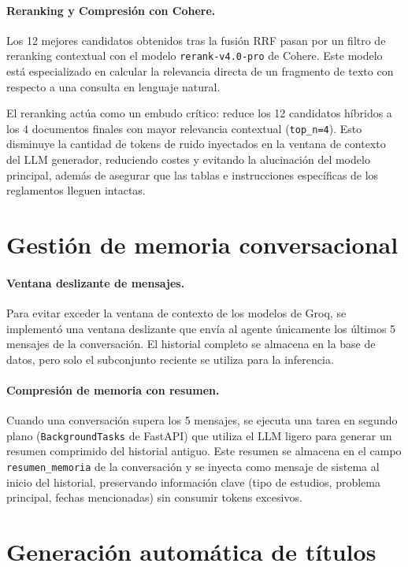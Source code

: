 \documentclass[12pt,a4paper,oneside]{report}
\begin{document}
\paragraph{Reranking y Compresión con Cohere.} Los 12 mejores candidatos obtenidos tras la fusión RRF pasan por un filtro de reranking contextual con el modelo \texttt{rerank-v4.0-pro} de Cohere. Este modelo está especializado en calcular la relevancia directa de un fragmento de texto con respecto a una consulta en lenguaje natural.

El reranking actúa como un embudo crítico: reduce los 12 candidatos híbridos a los 4 documentos finales con mayor relevancia contextual (\texttt{top\_n=4}). Esto disminuye la cantidad de tokens de ruido inyectados en la ventana de contexto del LLM generador, reduciendo costes y evitando la alucinación del modelo principal, además de asegurar que las tablas e instrucciones específicas de los reglamentos lleguen intactas.

\section{Gestión de memoria conversacional}
\paragraph{Ventana deslizante de mensajes.} Para evitar exceder la ventana de contexto de los modelos de Groq, se implementó una ventana deslizante que envía al agente únicamente los últimos 5 mensajes de la conversación. El historial completo se almacena en la base de datos, pero solo el subconjunto reciente se utiliza para la inferencia.

\paragraph{Compresión de memoria con resumen.} Cuando una conversación supera los 5 mensajes, se ejecuta una tarea en segundo plano (\texttt{BackgroundTasks} de FastAPI) que utiliza el LLM ligero para generar un resumen comprimido del historial antiguo. Este resumen se almacena en el campo \texttt{resumen\_memoria} de la conversación y se inyecta como mensaje de sistema al inicio del historial, preservando información clave (tipo de estudios, problema principal, fechas mencionadas) sin consumir tokens excesivos.


\section{Generación automática de títulos}
\end{document}
